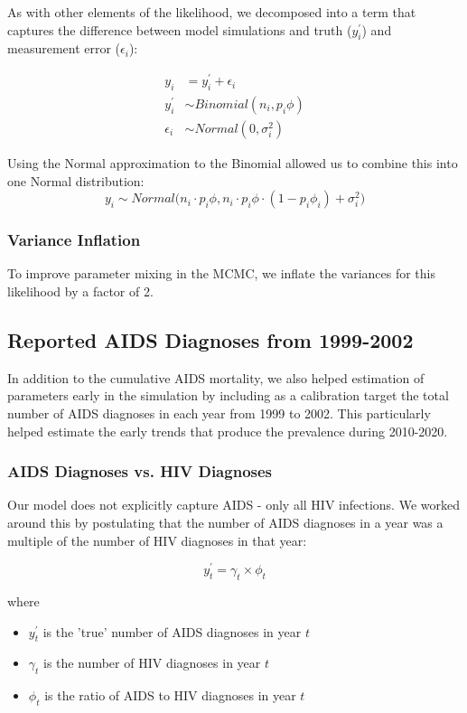 \documentclass{article}
\begin{document}
As with other elements of the likelihood, we decomposed into a term that captures the difference between model simulations and truth ($y^\prime_i$) and measurement error ($\epsilon_i$):

\begin{align}
	y_i &= y^\prime_i + \epsilon_i \\
	y^\prime_i &\sim Binomial(n_i, p_i \phi) \\
	\epsilon_i &\sim Normal(0, \sigma^2_i)
\end{align}

Using the Normal approximation to the Binomial allowed us to combine this into one Normal distribution: 
\begin{equation}
	y_i \sim Normal\big(n_i \cdot p_i \phi,n_i \cdot p_i \phi \cdot (1-p_i \phi_i) + \sigma^2_i \big)
\end{equation}


\subsubsection{Variance Inflation}
To improve parameter mixing in the MCMC, we inflate the variances for this likelihood by a factor of 2.

\subsection{Reported AIDS Diagnoses from 1999-2002}

In addition to the cumulative AIDS mortality, we also helped estimation of parameters early in the simulation by including as a calibration target the total number of AIDS diagnoses in each year from 1999 to 2002. This particularly helped estimate the early trends that produce the prevalence during 2010-2020.

\subsubsection{AIDS Diagnoses vs. HIV Diagnoses}
Our model does not explicitly capture AIDS - only all HIV infections. We worked around this by postulating that the number of AIDS diagnoses in a year was a multiple of the number of HIV diagnoses in that year:

\begin{equation} \label{AIDS_from_HIV_dx}
	y^\prime_t = \gamma_t \times \phi_t
\end{equation}

where
\begin{itemize}
	\item $y^\prime_t$ is the 'true' number of AIDS diagnoses in year $t$
	\item $\gamma_t$ is the number of HIV diagnoses in year $t$
	\item $\phi_t$ is the ratio of AIDS to HIV diagnoses in year $t$
\end{itemize}
\end{document}

